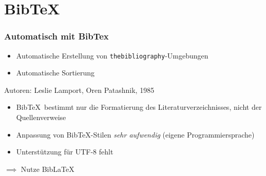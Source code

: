 \section{Bib\TeX}

\begin{frame}[fragile]
  \frametitle{Automatisch mit BibTex}
  \onslide<+->

  \begin{itemize} %
    \item<+-> Automatische Erstellung von \lstinline|thebibliography|-Umgebungen
    \item<+-> Automatische Sortierung
  \end{itemize}

  \onslide<+->

  Autoren: Leslie Lamport, Oren Patashnik, 1985

  \begin{itemize}
    \item<+-> Bib\TeX\ bestimmt nur die Formatierung des
      Literaturverzeichnisses, nicht der Quellenverweise
    \item<+-> Anpassung von Bib\TeX-Stilen \emph{sehr aufwendig} (eigene
      Programmiersprache) %
    \item<+-> Unterstützung für UTF-8 fehlt%
  \end{itemize}
  \onslide<+->
  \centerline{$\implies$ Nutze Bib\LaTeX}
\end{frame}

